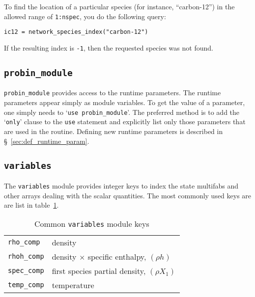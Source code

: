 To find the location of a particular species (for instance, ``carbon-12'')
in the allowed range of {\tt 1:nspec}, you do the following query:
\begin{lstlisting}[language={[95]fortran},mathescape=false]
  ic12 = network_species_index("carbon-12")
\end{lstlisting}
If the resulting index is {\tt -1}, then the requested species was not
found.

\subsection{{\tt probin\_module}}

\label{sec:probin}

{\tt probin\_module} provides access to the runtime parameters.
The runtime parameters appear simply as module variables.  To get the 
value of a parameter, one simply needs to `{\tt use probin\_module}'.
The preferred method is to add the `{\tt only}' clause to the
{\tt use} statement and explicitly list only those parameters that
are used in the routine.  Defining new runtime parameters is
described in \S~\ref{sec:def_runtime_param}.

\subsection{{\tt variables}}

\label{sec:variables_module}

The {\tt variables} module provides integer keys to index the state
multifabs and other arrays dealing with the scalar quantities.  The
most commonly used keys are are list in table~\ref{arch:table:variables}.

\begin{table}[h]
\caption{\label{arch:table:variables} Common {\tt variables} module keys}
\begin{center}
\begin{tabular}{ll}
\hline
{\tt rho\_comp}  & density \\
{\tt rhoh\_comp} & density $\times$ specific enthalpy, $(\rho h)$ \\
{\tt spec\_comp} & first species partial density, $(\rho X_1)$ \\
{\tt temp\_comp} & temperature \\
\hline
\end{tabular}
\end{center}
\end{table}

